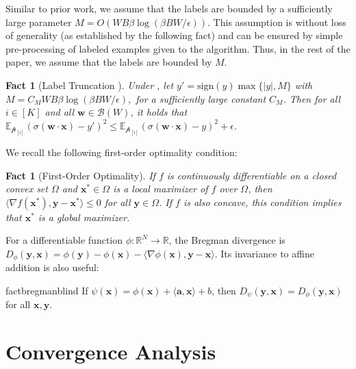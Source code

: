 \documentclass[11pt]{article}
\newcounter{thm}
\numberwithin{thm}{section}
\theoremstyle{plain}
\newtheorem{fact}[thm]{Fact}
\theoremstyle{definition}
\theoremstyle{remark} \newtheorem{remark}[thm]{Remark}
\def\va{{\bm{a}}}
\def\vw{{\bm{w}}}
\def\vx{{\bm{x}}}
\def\vy{{\bm{y}}}
\def\pp{{\mathcal{p}}}
\def\cB{{\mathcal{B}}}
\newcommand{\E}{\mathbb{E}}
\newcommand{\R}{\mathbb{R}}
\newcommand{\ppi}{{\pp_{[i]}}}
\begin{document}
Similar to prior work, we assume that the labels are bounded by a sufficiently large parameter $M = O(W B \beta \log(\beta B W / \epsilon))$. This assumption is without loss of generality (as established by the following fact) and can be ensured by simple pre-processing of labeled examples given to the algorithm. Thus, in the rest of the paper, we assume that the labels are bounded by $M$.
\begin{fact}[Label Truncation {\citep{wang2023robustly-learning}}]\label{fact:truncation}
Under , let $y' = \mathrm{sign}(y)\max\{|y|,M\}$ with
$M = C_M W B \beta \log(\beta B W / \epsilon),$
for a sufficiently large constant $C_M$. Then for all $i \in [K]$ and all $\vw \in \cB(W)$, it holds that
$\E_{\ppi}(\sigma(\vw \cdot \vx)-y')^2 \le \E_{\ppi}(\sigma(\vw \cdot \vx)-y)^2 + \epsilon$. 
\end{fact}

We recall the following first-order optimality condition:
\begin{fact}[First-Order Optimality]\label{fact:firstOrderNecessary}
If $f$ is continuously differentiable on a closed convex set $\Omega$ and $\vx^* \in \Omega$ is a local maximizer of $f$ over $\Omega$, then $\langle \nabla f(\vx^*), \vy-\vx^* \rangle \le 0$ for all $\vy \in \Omega$. If $f$ is also concave, this condition implies that $\vx^*$ is a global maximizer.
\end{fact}

For a differentiable function $\phi: \R^N \to \R$, the Bregman divergence is $D_{\phi}(\vy, \vx) = \phi(\vy) - \phi(\vx) - \langle \nabla \phi(\vx), \vy - \vx \rangle$. Its invariance to affine addition is also useful:
\begin{restatable}{fact}{bregmanblind}\label{fact:bregman-linear-blind}
If \(\psi(\vx)=\phi(\vx)+\langle\va,\vx\rangle+b\), then
\(D_\psi(\vy,\vx)=D_\phi(\vy,\vx)\)
for all \(\vx,\vy\).
\end{restatable}


\section{Convergence Analysis}\label{sec:algor-conv-analys}
\end{document}
